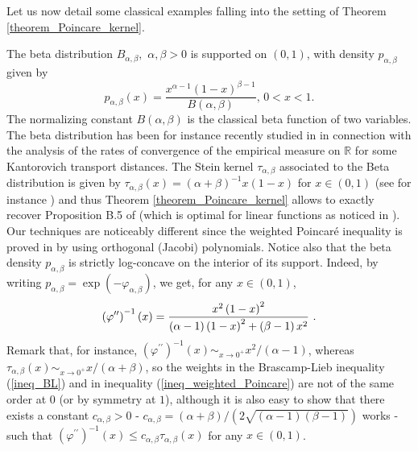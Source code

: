 \documentclass[11pt]{article}
\begin{document}
Let us now detail some classical examples falling into the setting of
Theorem \ref{theorem_Poincare_kernel}.

The beta distribution $B_{\alpha ,\beta },$ $\alpha ,\beta >0$ is supported
on $\left( 0,1\right) $, with density $p_{\alpha ,\beta }$ given by 
\begin{equation}
p_{\alpha ,\beta }\left( x\right) =\frac{x^{\alpha -1}\left( 1-x\right)
^{\beta -1}}{B\left( \alpha ,\beta \right) }\text{, \ \ }0<x<1\text{.}
\label{def_beta}
\end{equation}%
The normalizing constant $B\left( \alpha ,\beta \right) $ is the classical
beta function of two variables. The beta distribution has been for instance
recently studied in \cite{BobkovLedoux:14} in connection with the analysis
of the rates of convergence of the empirical measure on $\mathbb{R}$ for
some Kantorovich transport distances. The Stein kernel $\tau _{\alpha ,\beta
}$ associated to the Beta distribution is given by $\tau _{\alpha ,\beta
}\left( x\right) =\left( \alpha +\beta \right) ^{-1}x\left( 1-x\right) $ for 
$x\in \left( 0,1\right) $ (see for instance \cite{MR3595350}) and thus
Theorem \ref{theorem_Poincare_kernel} allows to exactly recover Proposition
B.5 of \cite{BobkovLedoux:14} (which is optimal for linear functions as
noticed in \cite{BobkovLedoux:14}). Our techniques are noticeably different
since the weighted Poincar\'{e} inequality is proved in \cite%
{BobkovLedoux:14} by using orthogonal (Jacobi) polynomials. Notice also that
the beta density $p_{\alpha ,\beta }$ is strictly log-concave on the
interior of its support. Indeed, by writing $p_{\alpha ,\beta }=\exp \left(
-\varphi _{\alpha ,\beta }\right) $, we get, for any $x\in \left( 0,1\right) 
$,%
\begin{equation*}
\left( \varphi ^{\prime \prime }\right) ^{-1}\left( x\right) =\frac{%
x^{2}\left( 1-x\right) ^{2}}{\left( \alpha -1\right) \left( 1-x\right)
^{2}+\left( \beta -1\right) x^{2}}\text{ .}
\end{equation*}%
Remark that, for instance, $\left( \varphi ^{\prime \prime }\right)
^{-1}\left( x\right) \sim _{x\rightarrow 0^{+}}x^{2}/\left( \alpha -1\right) 
$, whereas $\tau _{\alpha ,\beta }\left( x\right) \sim _{x\rightarrow
0^{+}}x/\left( \alpha +\beta \right) $, so the weights in the Brascamp-Lieb
inequality (\ref{ineq_BL}) and in inequality (\ref{ineq_weighted_Poincare})
are not of the same order at $0$ (or by symmetry at $1$), although it is
also easy to show that there exists a constant $c_{\alpha ,\beta }>0$ - $%
c_{\alpha ,\beta }=(\alpha +\beta )/\left( 2\sqrt{\left( \alpha -1\right)
\left( \beta -1\right) }\right) $ works - such that $\left( \varphi ^{\prime
\prime }\right) ^{-1}\left( x\right) \leq c_{\alpha ,\beta }\tau _{\alpha
,\beta }\left( x\right) $ for any $x\in \left( 0,1\right) $.
\end{document}
